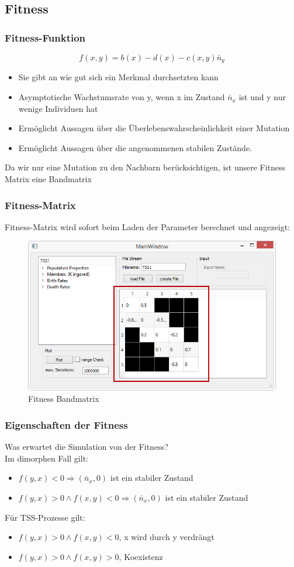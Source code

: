 \documentclass{beamer}
\begin{document}
	\subsection{Fitness}
		\begin{frame}
			\frametitle{Fitness-Funktion}
			\pause
			\[ f(x,y) = b(x) - d(x) - c(x,y)\bar{n}_y \]
			\pause
			\begin{itemize}
				\item Sie gibt an wie gut sich ein Merkmal durchsetzten kann
				\item Asymptotische Wachstumsrate von y, wenn x im Zustand $ \bar{n}_x $ ist und y nur wenige Individuen hat
				\item Ermöglicht Aussagen über die Überlebenswahrscheinlichkeit einer Mutation
				\item Ermöglicht Aussagen über die angenommenen stabilen Zustände.
			\end{itemize}
			\pause
			Da wir nur eine Mutation zu den Nachbarn berücksichtigen, ist unsere Fitness Matrix eine Bandmatrix
		\end{frame}
		\begin{frame}
			\frametitle{Fitness-Matrix}
			Fitness-Matrix wird sofort beim Laden der Parameter berechnet und angezeigt:
			\begin{figure}[H]
				\centering
				\includegraphics[width=0.7\linewidth]{./MainWindow_BandMatrix}
				\caption[Fitness Matrix]{Fitness Bandmatrix}
				\label{MainWindow mit Fitness Bandmatrix}
			\end{figure}
		\end{frame}
		\begin{frame}
			\frametitle{Eigenschaften der Fitness}
			Was erwartet die Simulation von der Fitness?\\
			\pause
			Im dimorphen Fall gilt:
			\begin{itemize}
				\item $ f(y,x) < 0 \Rightarrow (\bar{n}_x,0) $ ist ein stabiler Zustand
				\item $ f(y,x) > 0 \wedge f(x,y) < 0 \Rightarrow (\bar{n}_x,0) $ ist ein stabiler Zustand
			\end{itemize}
			\pause
			Für TSS-Prozesse gilt:
			\begin{itemize}
				\item $ f(y,x) > 0 \wedge f(x,y) < 0 $, x wird durch y verdrängt
				\item $ f(y,x) > 0 \wedge f(x,y) > 0 $, Koexistenz
			\end{itemize}
		\end{frame}	
\end{document}
